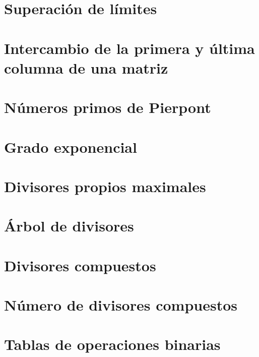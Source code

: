 \documentclass[a4paper,12pt,twoside]{book}
\begin{document}
\chapter{Superación de límites}
\label{141218}


\chapter{Intercambio de la primera y última columna de
  una matriz}
\label{171218}

\chapter{Números primos de Pierpont}
\label{181218}

\chapter{Grado exponencial}
\label{191218}

\chapter{Divisores propios maximales}
\label{201218}

\chapter{Árbol de divisores}
\label{211218}


\chapter{Divisores compuestos}
\label{181224}

\chapter{Número de divisores compuestos}
\label{181225}

\chapter{Tablas de operaciones binarias}
\label{181226}
\end{document}
